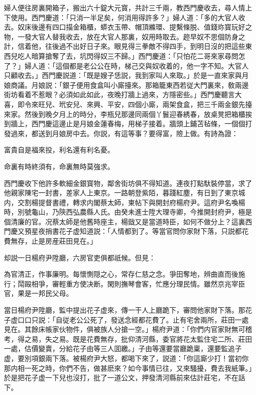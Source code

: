 婦人便往房裏開箱子，搬出六十錠大元寳，共計三千兩，教西門慶收去，尋人情上下使用。西門慶道：「只消一半足矣，何消用得許多？」婦人道：「多的大官人收去。奴床後邊有四口描金箱櫃，蟒衣玉帶、帽頂縧環、提繫條脱、值錢珎寳玩好之物，一發大官人替我收去，放在大官人那裏，奴用時取去。趂早奴不思個防身之計，信着他，往後過不出好日子來。眼見得三拳敵不得四手，到明日沒的把這些東西兒吃人暗算搶奪了去，坑閃得奴三不歸。」西門慶道：「只怕花二哥來家尋問怎了？」婦人道：「這個都是老公公在時，梯己交與奴收着的，他一字不知。大官人只顧收去。」西門慶説道：「既是嫂子恁説，我到家叫人來取。」於是一直來家與月娘商議。月娘説：「銀子便用食盒叫小廝擡來。那箱籠東西若従大門裏來，敎兩邊街坊看着不惹眼？必須如此如此，夜晚打牆上過來，方隱密些。」西門慶聽言大喜，即令來旺兒、玳安兒、來興、平安，四個小廝，兩架食盒，把三千兩金銀先擡來家。然後到晚夕月上的時分，李瓶兒那邊同兩個丫鬟迎春綉春，放桌凳把箱櫃挨到牆上，西門慶這邊止是月娘金蓮春梅，用梯子接着。牆頭上鋪苫毡條，一個個打發過來，都送到月娘房中去。你説，有這等事？要得富，險上做。有詩為證：

富貴自是福來投，利名還有利名憂。

命裏有時終須有，命裏無時莫強求。

西門慶收下他許多軟細金銀寳物，鄰舍街坊俱不得知道。連夜打點馱裝停當，求了他親家陳宅一封書，差家人上東京。一路朝登紫陌，暮踐紅塵，有日到了東京城内，交割楊提督書禮，轉求内閣蔡太師，柬帖下與開封府楊府尹。這府尹名喚楊時，別號龜山，乃陝西弘農縣人氏。由癸未進士陞大理寺卿，今推開封府尹，極是個清廉的官。况蔡太師是他舊時座主，楊戩又是當道時臣，如何不做分上？這裏西門慶又預星夜捎書花子虚知道説：「人情都到了。等當官問你家財下落，只説都花費無存，止是房産莊田見在。」

却説一日楊府尹陞廳，六房官吏俱都祇候。但見：

為官清正，作事廉明。每懷惻隠之心，常存仁慈之念。爭田奪地，辨曲直而後施行；鬦毆相爭，審輕重方使决断。閑則撫琴會客，忙應分理民情。雖然京兆宰臣官，果是一邦民父母。

當日楊府尹陞廳，監中提出花子虚來，傳一干人上廳跪下，審問他家財下落。那花子虚口口只説：「自従老公公死了，發送念經都花費了。止有宅舍兩所，莊田一處見在。其餘床帳家伙物件，俱被族人分搶一空。」楊府尹道：「你們内官家財無可稽考，得之易，失之易。既是花費無存，批仰清河縣，委官將花太監住宅二所、莊田一處，估價變賣，分給花子由等三人囬繳。」子由等還要當廳跪稟，還要監追子虚，要別項銀兩下落。被楊府尹大怒，都喝下來了，説道：「你這廝少打！當初你那内相一死之時，你們不告，做甚麽來？如今事情已往，又來騷擾，費去我紙筆。」於是把花子虚一下兒也沒打，批了一道公文，押發清河縣前來估計莊宅，不在話下。

